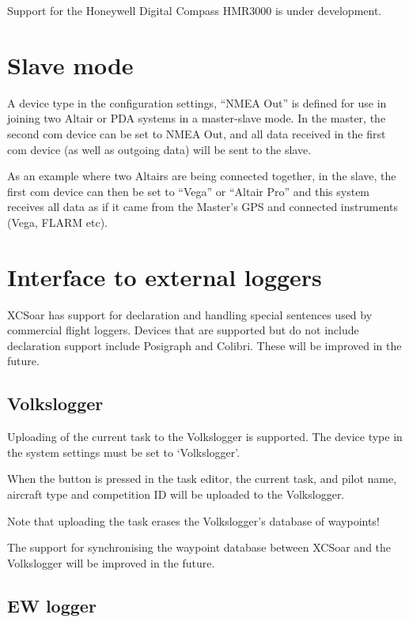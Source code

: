 \documentclass[a4paper,12pt]{refrep}
\begin{document}
Support for the Honeywell Digital Compass HMR3000 is under
development.

\section{Slave mode}

A device type in the configuration settings, ``NMEA Out'' is defined
for use in joining two Altair or PDA systems in a master-slave mode.
In the master, the second com device can be set to NMEA Out, and all
data received in the first com device (as well as outgoing data) will
be sent to the slave.  

As an example where two Altairs are being connected together, in the
slave, the first com device can then be set to ``Vega'' or ``Altair
Pro'' and this system receives all data as if it came from the
Master's GPS and connected instruments (Vega, FLARM etc).

\section{Interface to external loggers}

XCSoar has support for declaration and handling special sentences used
by commercial flight loggers.  Devices that are supported but do not
include declaration support include Posigraph and Colibri.  These will
be improved in the future.

\subsection*{Volkslogger}

Uploading of the current task to the Volkslogger is supported.  The
device type in the system settings must be set to `Volkslogger'.

When the  button is pressed in the task editor, the
current task, and pilot name, aircraft type and competition ID will be
uploaded to the Volkslogger.

Note that uploading the task erases the Volkslogger's database of
waypoints!

The support for synchronising the waypoint database between XCSoar and
the Volkslogger will be improved in the future. 

\subsection*{EW logger}
\end{document}
